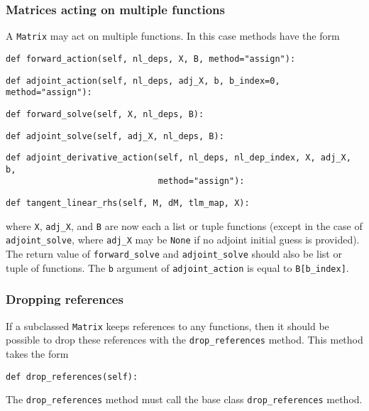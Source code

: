 \documentclass[11pt]{article}
\begin{document}
\subsubsection{Matrices acting on multiple functions}\label{sect:Matrix_multiple}

A \texttt{Matrix} may act on multiple functions. In this case methods have the
form
\begin{lstlisting}
def forward_action(self, nl_deps, X, B, method="assign"):
\end{lstlisting}
\begin{lstlisting}
def adjoint_action(self, nl_deps, adj_X, b, b_index=0, method="assign"):
\end{lstlisting}
\begin{lstlisting}
def forward_solve(self, X, nl_deps, B):
\end{lstlisting}
\begin{lstlisting}
def adjoint_solve(self, adj_X, nl_deps, B):
\end{lstlisting}
\begin{lstlisting}
def adjoint_derivative_action(self, nl_deps, nl_dep_index, X, adj_X, b,
                              method="assign"):
\end{lstlisting}
\begin{lstlisting}
def tangent_linear_rhs(self, M, dM, tlm_map, X):
\end{lstlisting}
where \texttt{X}, \texttt{adj\_X}, and \texttt{B} are now each a list or tuple
functions (except in the case of \texttt{adjoint\_solve}, where \texttt{adj\_X}
may be \texttt{None} if no adjoint initial guess is provided). The return value
of \texttt{forward\_solve} and \texttt{adjoint\_solve} should also be list or
tuple of functions. The \texttt{b} argument of \texttt{adjoint\_action} is
equal to \texttt{B[b\_index]}.

\subsubsection{Dropping references}

If a subclassed \texttt{Matrix} keeps references to any functions, then it
should be possible to drop these references with the \texttt{drop\_references}
method. This method takes the form
\begin{lstlisting}
def drop_references(self):
\end{lstlisting}
The \texttt{drop\_references} method must call the base class
\texttt{drop\_references} method.
\end{document}
